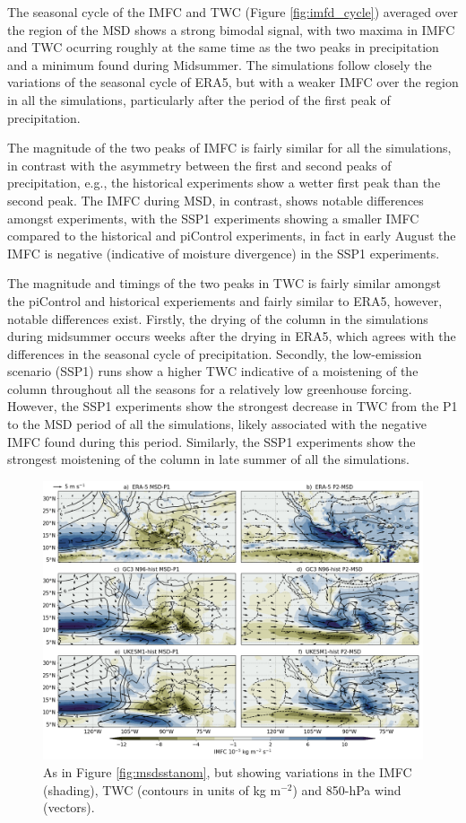 The seasonal cycle of the IMFC and TWC (Figure \ref{fig:imfd_cycle}) averaged over the region of the MSD shows a strong bimodal signal, with two maxima in IMFC and TWC ocurring roughly at the same time as the two peaks in precipitation and a minimum found during Midsummer. The simulations follow closely the variations of the seasonal cycle of ERA5, but with a weaker IMFC over the region in all the simulations, particularly after the period of the first peak of precipitation. 

The magnitude of the two peaks of IMFC is fairly similar for all the simulations, in contrast with the asymmetry between the first and second peaks of precipitation, e.g., the historical experiments show a wetter first peak than the second peak. The IMFC during MSD, in contrast, shows notable differences amongst experiments, with the SSP1 experiments showing a smaller IMFC compared to the historical and piControl experiments, in fact in early August the IMFC is negative (indicative of moisture divergence) in the SSP1 experiments.


 The magnitude and timings of the two peaks in  TWC is fairly similar amongst the piControl and historical experiements and fairly similar to ERA5, however, notable differences exist. Firstly, the drying of the column in the simulations during midsummer occurs weeks after the drying in ERA5, which agrees with the differences in the seasonal cycle of precipitation. Secondly, the low-emission scenario (SSP1) runs show a higher TWC indicative of a moistening of the column throughout all the seasons for a relatively low greenhouse forcing. However,  the SSP1 experiments show the strongest decrease in TWC from the P1 to the MSD period of all the simulations, likely associated with the negative IMFC found during this period. Similarly, the SSP1 experiments show the strongest moistening of the column in late summer of all the simulations.

\begin{figure}[t!]
\includegraphics[width=\linewidth]{figures/imfdcomposite.png}
\caption[Composites of IMFC, TWC and CLLJ]{As in Figure \ref{fig:msdsstanom}, but showing variations in the IMFC (shading), TWC (contours in units of kg m$^{-2}$) and 850-hPa wind (vectors). }
\label{fig:msdmfcanom}
\end{figure}

